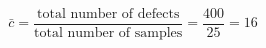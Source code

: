 

\[
\bar{c} = \frac{\mbox{total number of defects}}{\mbox{total number of samples}} = \frac{400} {25} = 16
\]


